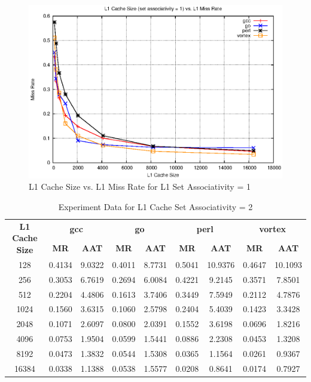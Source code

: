 \documentclass[a4paper]{article}
\begin{document}
\begin{figure}
    \centering
    \includegraphics[scale=1.32] {l1_sa_1.eps}
    \captionsetup{justification=centering}
    \caption{L1 Cache Size vs. L1 Miss Rate for L1 Set Associativity = 1}
    \label{fig:l1mr_graph_sa1}
\end{figure}

\begin{table}[htbp]
    \centering
    \begin{tabular}{|c|c|c|c|c|c|c|c|c|}
        \hline
        \multirow{2}[4]{*}{\bf L1 Cache Size} & \multicolumn{2}{c|}{\bf gcc} & \multicolumn{2}{c|}{\bf go} & \multicolumn{2}{c|}{\bf perl}          &\multicolumn{2}{c|}{\bf vortex}\\
        \cline{2-9} & \bf MR & \bf AAT & \bf MR & \bf AAT & \bf MR & \bf AAT & \bf MR & \bf AAT \\
        \hline
        128 & 0.4134 & 9.0322 & 0.4011 & 8.7731 & 0.5041 & 10.9376 & 0.4647 & 10.1093 \\
        256 & 0.3053 & 6.7619 & 0.2694 & 6.0084 & 0.4221 & 9.2145 & 0.3571 & 7.8501 \\
        512 & 0.2204 & 4.4806 & 0.1613 & 3.7406 & 0.3449 & 7.5949 & 0.2112 & 4.7876 \\
        1024 & 0.1560 & 3.6315 & 0.1060 & 2.5798 & 0.2404 & 5.4039 & 0.1423 & 3.3428 \\
        2048 & 0.1071 & 2.6097 & 0.0800 & 2.0391 & 0.1552 & 3.6198 & 0.0696 & 1.8216 \\
        4096 & 0.0753 & 1.9504 & 0.0599 & 1.5441 & 0.0886 & 2.2308 & 0.0453 & 1.3208 \\
        8192 & 0.0473 & 1.3832 & 0.0544 & 1.5308 & 0.0365 & 1.1564 & 0.0261 & 0.9367 \\
        16384 & 0.0338 & 1.1388 & 0.0538 & 1.5577 & 0.0208 & 0.8641 & 0.0174 & 0.7927 \\
        \hline
    \end{tabular}
    \captionsetup{justification=centering}
    \caption{Experiment Data for L1 Cache Set Associativity = 2}
    \label{tab:l1mr_data_sa2}
\end{table}
\end{document}
